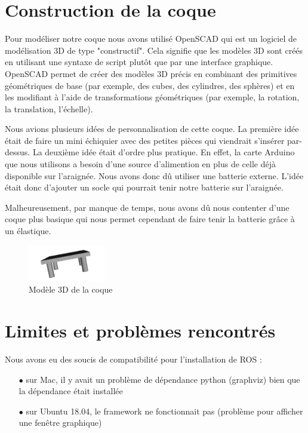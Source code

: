 		\section{Construction de la coque}

Pour modéliser notre coque nous avons utilisé OpenSCAD qui est un logiciel de modélisation 3D de type "constructif". 
Cela signifie que les modèles 3D sont créés en utilisant une syntaxe de script plutôt que par une interface graphique. 
OpenSCAD permet de créer des modèles 3D précis en combinant des primitives géométriques de base (par exemple, des cubes, des cylindres, 
des sphères) et en les modifiant à l'aide de transformations géométriques (par exemple, la rotation, la translation, l'échelle).  
\linebreak

Nous avions plusieurs idées de personnalisation de cette coque. La première idée était de faire un mini échiquier avec des petites 
pièces qui viendrait s’insérer par-dessus.  
La deuxième idée était d'ordre plus pratique. En effet, la carte Arduino que nous utilisons a besoin d’une source d’alimention 
en plus de celle déjà disponible sur l’araignée. Nous avons donc dû utiliser une batterie externe. 
L’idée était donc d’ajouter un socle qui pourrait tenir notre batterie sur l’araignée. 
\linebreak

Malheureusement, par manque de temps, nous avons dû nous contenter d’une coque plus basique qui nous permet cependant de 
faire tenir la batterie grâce à un élastique. 

\begin{figure}[H]
	\begin{center}
		\includegraphics[width=0.3\textwidth]{./img/coque}
		\caption{Modèle 3D de la coque}
	\end{center}
\end{figure}


		\section{Limites et problèmes rencontrés}

Nous avons eu des soucis de compatibilité pour l'installation de ROS :  
\begin{itemize}
	\item[$\bullet$] sur Mac, il y avait un problème de dépendance python (graphviz) bien que la dépendance était installée
	\item[$\bullet$]sur Ubuntu 18.04, le framework ne fonctionnait pas (problème pour afficher une fenêtre graphique)
\end{itemize}

